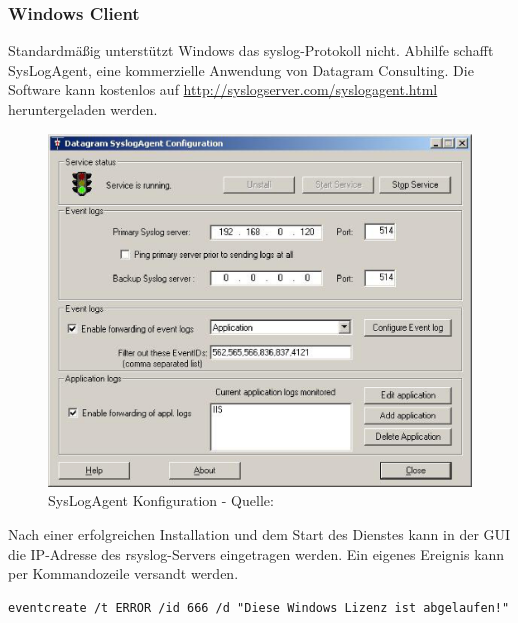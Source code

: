 \subsubsection{Windows Client}
Standardmäßig unterstützt Windows das syslog-Protokoll nicht. Abhilfe schafft SysLogAgent, eine kommerzielle Anwendung von Datagram Consulting. Die Software kann kostenlos auf \url{http://syslogserver.com/syslogagent.html} heruntergeladen werden.

\begin{figure}[h]
\begin{center}
 \includegraphics[width=\textwidth]{content/images/syslogagent.eps}
  \caption{SysLogAgent Konfiguration - Quelle: \cite{SysLogAgentScreendump}}
\end{center}
\end{figure}

Nach einer erfolgreichen Installation und dem Start des Dienstes kann in der GUI die IP-Adresse des rsyslog-Servers eingetragen werden. Ein eigenes Ereignis kann per Kommandozeile versandt werden.

\begin{lstlisting}
eventcreate /t ERROR /id 666 /d "Diese Windows Lizenz ist abgelaufen!"
\end{lstlisting}
